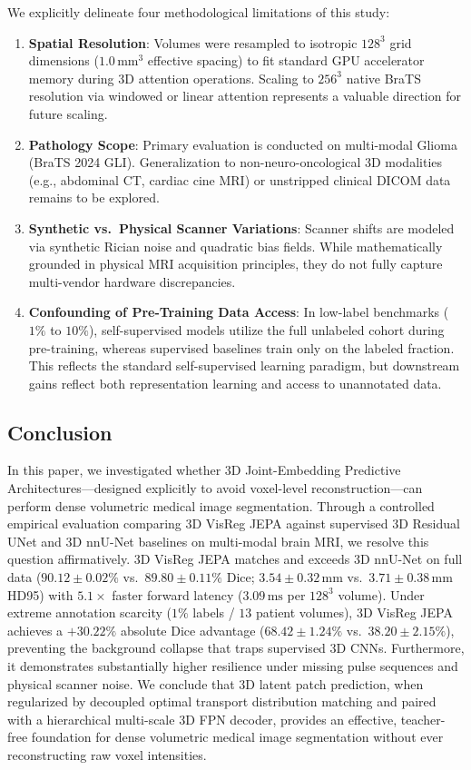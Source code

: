 \documentclass{article}
\begin{document}
We explicitly delineate four methodological limitations of this study:
\begin{enumerate}
    \item \textbf{Spatial Resolution}: Volumes were resampled to isotropic $128^3$ grid dimensions ($1.0\,\text{mm}^3$ effective spacing) to fit standard GPU accelerator memory during 3D attention operations. Scaling to $256^3$ native BraTS resolution via windowed or linear attention represents a valuable direction for future scaling.
    \item \textbf{Pathology Scope}: Primary evaluation is conducted on multi-modal Glioma (BraTS 2024 GLI). Generalization to non-neuro-oncological 3D modalities (e.g., abdominal CT, cardiac cine MRI) or unstripped clinical DICOM data remains to be explored.
    \item \textbf{Synthetic vs.\ Physical Scanner Variations}: Scanner shifts are modeled via synthetic Rician noise and quadratic bias fields. While mathematically grounded in physical MRI acquisition principles, they do not fully capture multi-vendor hardware discrepancies.
    \item \textbf{Confounding of Pre-Training Data Access}: In low-label benchmarks ($1\%$ to $10\%$), self-supervised models utilize the full unlabeled cohort during pre-training, whereas supervised baselines train only on the labeled fraction. This reflects the standard self-supervised learning paradigm, but downstream gains reflect both representation learning and access to unannotated data.
\end{enumerate}

\subsection{Conclusion}
\label{sec:conclusion}

In this paper, we investigated whether 3D Joint-Embedding Predictive Architectures---designed explicitly to avoid voxel-level reconstruction---can perform dense volumetric medical image segmentation. Through a controlled empirical evaluation comparing 3D VisReg JEPA against supervised 3D Residual UNet and 3D nnU-Net baselines on multi-modal brain MRI, we resolve this question affirmatively. 3D VisReg JEPA matches and exceeds 3D nnU-Net on full data ($90.12 \pm 0.02\%$ vs.\ $89.80 \pm 0.11\%$ Dice; $3.54 \pm 0.32\,\text{mm}$ vs.\ $3.71 \pm 0.38\,\text{mm}$ HD95) with $5.1\times$ faster forward latency ($3.09\,\text{ms}$ per $128^3$ volume). Under extreme annotation scarcity ($1\%$ labels / $13$ patient volumes), 3D VisReg JEPA achieves a $\mathbf{+30.22\%}$ absolute Dice advantage ($68.42 \pm 1.24\%$ vs.\ $38.20 \pm 2.15\%$), preventing the background collapse that traps supervised 3D CNNs. Furthermore, it demonstrates substantially higher resilience under missing pulse sequences and physical scanner noise. We conclude that 3D latent patch prediction, when regularized by decoupled optimal transport distribution matching and paired with a hierarchical multi-scale 3D FPN decoder, provides an effective, teacher-free foundation for dense volumetric medical image segmentation without ever reconstructing raw voxel intensities.



\end{document}

